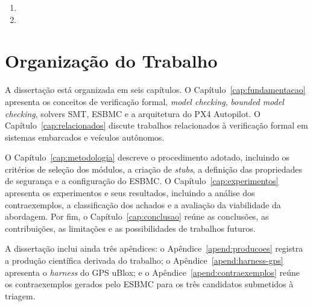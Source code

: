 \begin{enumerate}
\item {}

\item {}

\end{enumerate}

\section{Organização do Trabalho}
\label{sec:organizacao}

A dissertação está organizada em seis capítulos. O Capítulo~\ref{cap:fundamentacao} apresenta os conceitos de verificação formal, \textit{model checking}, \textit{bounded model checking}, solvers SMT, ESBMC e a arquitetura do PX4 Autopilot. O Capítulo~\ref{cap:relacionados} discute trabalhos relacionados à verificação formal em sistemas embarcados e veículos autônomos.

O Capítulo~\ref{cap:metodologia} descreve o procedimento adotado, incluindo os critérios de seleção dos módulos, a criação de \textit{stubs}, a definição das propriedades de segurança e a configuração do ESBMC. O Capítulo~\ref{cap:experimentos} apresenta os experimentos e seus resultados, incluindo a análise dos contraexemplos, a classificação dos achados e a avaliação da viabilidade da abordagem. Por fim, o Capítulo~\ref{cap:conclusao} reúne as conclusões, as contribuições, as limitações e as possibilidades de trabalhos futuros.

A dissertação inclui ainda três apêndices: o Apêndice~\ref{apend:producoes} registra a produção científica derivada do trabalho; o Apêndice~\ref{apend:harness-gps} apresenta o \textit{harness} do GPS uBlox; e o Apêndice~\ref{apend:contraexemplos} reúne os contraexemplos gerados pelo ESBMC para os três candidatos submetidos à triagem.
